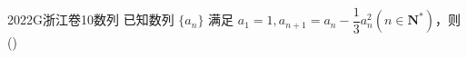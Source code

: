 
\begin{problem}{2022}{G}{浙江卷}{10}{数列}
已知数列 $\{a_n\}$ 满足 $a_1=1, a_{n+1}=a_n-\dfrac{1}{3}a_n^2(n\in \mathbf{N}^*)$，则
(\hspace{1cm})
\begin{choices}
\end{choices}
\end{problem}